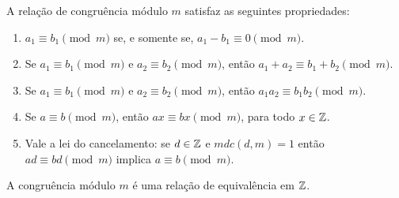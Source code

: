 \documentclass{beamer}
\begin{document}
    \begin{frame}
        \begin{teorema}
            A rela{\c c}{\~a}o de congru{\^e}ncia m{\'o}dulo $m$ satisfaz as seguintes propriedades:\pause
            \begin{enumerate}[label={\roman*})]
                \item $a_{1}\equiv b_{1}\pmod{m}$ se, e somente se, $a_{1}-b_{1}\equiv 0\pmod{m}$.\pause \vspace{.3cm}

                \item Se $a_{1}\equiv b_{1}\pmod{m}$ e $a_{2}\equiv b_{2}\pmod{m}$, ent{\~a}o $a_{1}+a_{2}\equiv b_{1}+b_{2}\pmod{m}$.\pause \vspace{.3cm}

                \item Se $a_{1}\equiv b_{1}\pmod{m}$ e $a_{2}\equiv b_{2}\pmod{m}$, ent{\~a}o $a_{1}a_{2}\equiv b_{1}b_{2}\pmod{m}$.\label{item_provado}\pause \vspace{.3cm}

                \item Se $a\equiv b\pmod{m}$, ent{\~a}o $ax\equiv bx\pmod{m}$, para todo $x \in \mathbb{Z}$.\pause \vspace{.3cm}

                \item Vale a lei do cancelamento: se $d \in \mathbb{Z}$ e $mdc(d,m) = 1$ ent{\~a}o $ad \equiv bd \pmod{m}$ implica $a\equiv b \pmod{m}$.
            \end{enumerate}
        \end{teorema}
    \end{frame}

    \begin{frame}
        \begin{proposicao}
            A congru{\^e}ncia m{\'o}dulo $m$ {\'e} uma rela{\c c}{\~a}o de equival{\^e}ncia em $\mathbb{Z}$.
        \end{proposicao}
    \end{frame}
\end{document}
